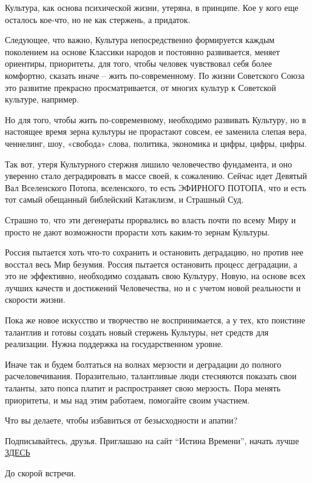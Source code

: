 \begin{zznagolos}
Культура, как основа психической жизни, утеряна, в принципе. Кое у кого еще
осталось кое-что, но не как стержень, а придаток.	
\end{zznagolos}

Следующее, что важно, Культура непосредственно формируется каждым поколением на
основе Классики народов и постоянно развивается, меняет ориентиры, приоритеты,
для того, чтобы человек чувствовал себя более комфортно, сказать иначе – жить
по-современному. По жизни Советского Союза это развитие прекрасно
просматривается, от многих культур к Советской культуре, например.

Но для того, чтобы жить по-современному, необходимо развивать Культуру, но в
настоящее время зерна культуры не прорастают совсем, ее заменила слепая вера,
ченнелинг, шоу, «свобода» слова, политика, экономика и цифры, цифры, цифры.

\begin{zznagolos}
Так вот, утеря Культурного стержня лишило человечество фундамента, и оно
уверенно стало деградировать в массе своей, к сожалению. Сейчас идет Девятый
Вал Вселенского Потопа, вселенского, то есть ЭФИРНОГО ПОТОПА, что и есть тот
самый обещанный библейский Катаклизм, и Страшный Суд.	
\end{zznagolos}

Страшно то, что эти дегенераты прорвались во власть почти по всему Миру и
просто не дают возможности прорасти хоть каким-то зернам Культуры.

Россия пытается хоть что-то сохранить и остановить деградацию, но против нее
восстал весь Мир безумия. Россия пытается остановить процесс деградации, а это
не эффективно, необходимо создавать свою Культуру, Новую, на основе всех лучших
качеств и достижений Человечества, но и с учетом новой реальности и скорости
жизни.

Пока же новое искусство и творчество не воспринимается, а у тех, кто поистине
талантлив и готовы создать новый стержень Культуры, нет средств для реализации.
Нужна поддержка на государственном уровне.

Иначе так и будем болтаться на волнах мерзости и деградации до полного
расчеловечивания. Поразительно, талантливые люди стесняются показать свои
таланты, зато попса платит и распространяет свою мерзость. Пора менять
приоритеты, и мы над этим работаем, помогайте своим участием.

Что вы делаете, чтобы избавиться от безысходности и апатии?

Подписывайтесь, друзья. Приглашаю на сайт \enquote{Истина Времени}, начать лучше 
\href{https://istinavremeni.ru/yasnovidenie/treningi}{ЗДЕСЬ}

До скорой встречи.
